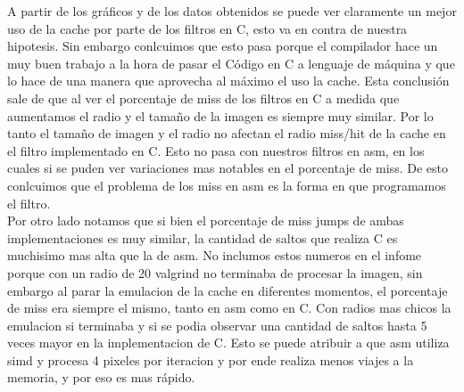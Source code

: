 A partir de los gráficos y de los datos obtenidos se puede ver claramente un mejor uso de la cache por parte de los filtros en C, esto va en contra de nuestra hipotesis. Sin embargo conlcuimos que esto pasa porque el compilador hace un muy buen trabajo a la hora de pasar el Código en C a lenguaje de máquina y que lo hace de una manera que aprovecha al máximo el uso la cache. Esta conclusión sale de que al ver el porcentaje de miss de los filtros en C a medida que aumentamos el radio y el tamaño de la imagen es siempre muy similar. Por lo tanto el tamaño de imagen y el radio no afectan el radio miss/hit de la cache en el filtro implementado en  C. Esto no pasa con nuestros filtros en asm, en los cuales si se puden ver variaciones mas notables en el porcentaje de miss. De esto conlcuimos que el problema de los miss en asm es la forma en que programamos el filtro. \\
Por otro lado notamos que si bien el porcentaje de miss jumps de ambas implementaciones es muy similar, la cantidad de saltos que realiza C es muchisimo mas alta que la de asm. No inclumos estos numeros en el infome porque con un radio de 20 valgrind no terminaba de procesar la imagen, sin embargo al parar la emulacion de la cache en diferentes momentos, el porcentaje de miss era siempre el mismo, tanto en asm como en C. Con radios mas chicos la emulacion si terminaba y si se podia observar una cantidad de saltos hasta 5 veces mayor en la implementacion de C. Esto se puede atribuir a que asm utiliza simd y procesa 4 pixeles por iteracion y por ende realiza menos viajes a la memoria, y por eso es mas rápido.